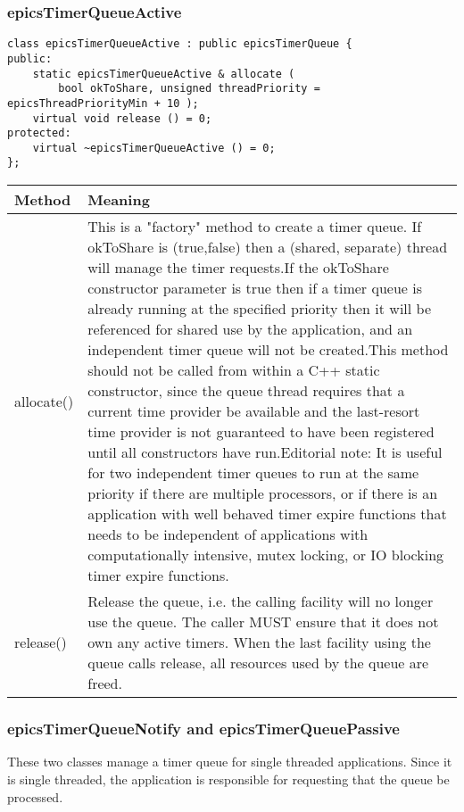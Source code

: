 \subsubsection{epicsTimerQueueActive}

\begin{verbatim}class epicsTimerQueueActive : public epicsTimerQueue {
public:
    static epicsTimerQueueActive & allocate (
        bool okToShare, unsigned threadPriority = epicsThreadPriorityMin + 10 );
    virtual void release () = 0;
protected:
    virtual ~epicsTimerQueueActive () = 0;
};
\end{verbatim}
\begin{center}\begin{longtable}{p{1.1in}p{5.0in}}
\textbf{Method} & \textbf{Meaning}\\
\hline
allocate() & This is a "factory" method to create a timer queue. If okToShare is (true,false) then a (shared, separate) thread will manage the timer requests.If the okToShare constructor parameter is true then if a timer queue is already running at the specified priority then it will be referenced for shared use by the application, and an independent timer queue will not be created.This method should not be called from within a C++ static constructor, since the queue thread requires that a current time provider be available and the last-resort time provider is not guaranteed to have been registered until all constructors have run.Editorial note: It is useful for two independent timer queues to run at the same priority if there are multiple processors, or if there is an application with well behaved timer expire functions that needs to be independent of applications with computationally intensive, mutex locking, or IO blocking timer expire functions. \\
release() & Release the queue, i.e. the calling facility will no longer use the queue. The caller MUST ensure that it does not own any active timers. When the last facility using the queue calls release, all resources used by the queue are freed.
\end{longtable}\end{center}


\subsubsection{epicsTimerQueueNotify and epicsTimerQueuePassive}

These two classes manage a timer queue for single threaded applications. Since it is single threaded, the application is 
responsible for requesting that the queue be processed.

